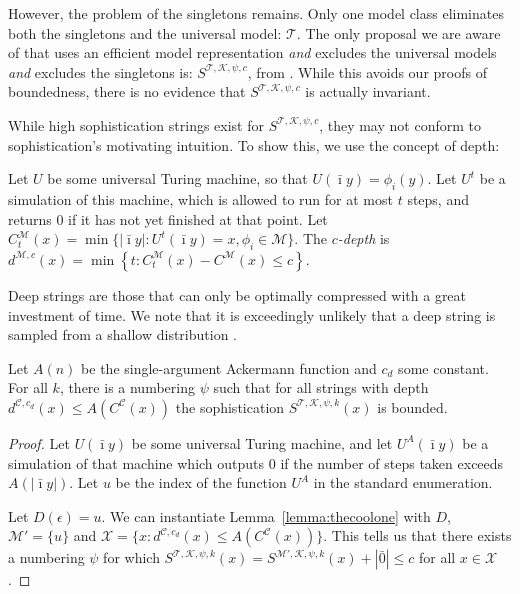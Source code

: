 \documentclass{style/llncs}
\newcommand{\M}{\mathscr M}
\newcommand{\C}{\mathscr C}
\newcommand{\T}{\mathscr T}
\newcommand{\K}{\mathscr K}
\newcommand{\X}{\mathscr X}
\begin{document}
However, the problem of the singletons remains. Only one model class eliminates both the singletons and the universal model: $\T$. The only proposal we are aware of that uses an efficient model representation \emph{and} excludes the universal models \emph{and} excludes the singletons is: $S^{\T,\K,\psi,c}$, from \cite{vitanyi2004meaningful}. While this avoids our proofs of boundedness, there is no evidence that $S^{\T,\K,\psi, c}$ is actually invariant.

While high sophistication strings exist for $S^{\T,\K,\psi, c}$, they may not conform to sophistication's motivating intuition. To show this, we use the concept of depth:

\begin{definition}\belowdisplayskip=-12pt
Let $U$ be some universal Turing machine, so that $U(\bar\imath y) = \phi_i(y)$. Let $U^t$ be a simulation of this machine, which is allowed to run for at most $t$ steps, and returns $0$ if it has not yet finished at that point. Let $C^\M_t(x) = \min\{|\bar\imath y| : U^t(\bar\imath y) = x, \phi_i \in \M\}$. The \emph{$c$-depth} is $d^{\M,c}(x) = \min \left\{t : C^\M_t(x) - C^\M(x) \leq c \right\}$.
\end{definition}
Deep strings are those that can only be optimally compressed with a great investment of time. We note that it is exceedingly unlikely that a deep string is sampled from a shallow distribution \cite{bloem2014safe,bennett1988logical}. 
 
\begin{theorem}
Let $A(n)$ be the single-argument Ackermann function and $c_d$ some constant. For all $k$, there is a numbering $\psi$ such that for all strings with depth $d^{\C,c_d}(x) \leq A(C^\C(x))$ the sophistication $S^{\T, \K, \psi, k}(x)$ is bounded.\label{thm:depth}
\end{theorem}

\begin{proof}
Let $U(\bar\imath y)$ be some universal Turing machine, and let $U^A(\bar\imath y)$ be a simulation of that machine which outputs $0$ if the number of steps taken exceeds $A(|\bar\imath y|)$. Let $u$ be the index of the function $U^A$ in the standard enumeration.

Let $D(\epsilon) = u$. We can instantiate Lemma~\ref{lemma:thecoolone} with $D$, $\M' = \{u\}$ and $\X = \{x : d^{\C,c_d}(x) \leq A(C^\C(x))\}$. This tells us that there exists a numbering $\psi$ for which $S^{\T, \K,\psi,k}(x) = S^{\M', \K, \psi, k}(x) + |\bar0| \leq c$ for all $x \in \X$.
\end{proof}
\end{document}
